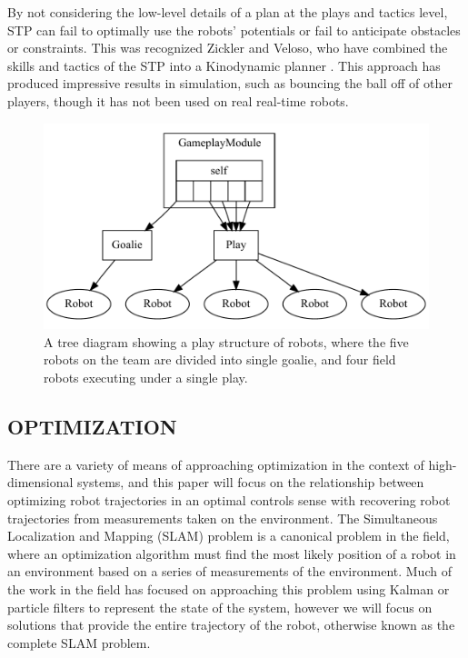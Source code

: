 \documentclass[a4paper, 10pt, conference]{ieeeconf}      %
\begin{document}
By not considering the low-level details of a plan at the plays and tactics level, STP can fail to optimally use the robots' potentials or fail to anticipate obstacles or constraints. This was recognized Zickler and Veloso, who have combined the skills and tactics of the STP into a Kinodynamic planner \cite{zickler2008playing}. This approach has produced impressive results in simulation, such as bouncing the ball off of other players, though it has not been used on real real-time robots.

\begin{figure}[ht!]
\begin{center}
\includegraphics[totalheight=1.6in]{gen_play}
\end{center}
\caption{A tree diagram showing a play structure of robots, where the five robots on the team are divided into single goalie, and four field robots executing under a single play.}
\label{play_structure}
\end{figure}

\subsection{OPTIMIZATION}

There are a variety of means of approaching optimization in the context of high-dimensional systems, and this paper will focus on the relationship between optimizing robot trajectories in an optimal controls sense with recovering robot trajectories from measurements taken on the environment.  The Simultaneous Localization and Mapping (SLAM) problem is a canonical problem in the field, where an optimization algorithm must find the most likely position of a robot in an environment based on a series of measurements of the environment.  Much of the work in the field has focused on approaching this problem using Kalman or particle filters  \cite{Thrun05book, Thrun04ijrr, Dellaert03tutorial} to represent the state of the system, however we will focus on solutions that provide the entire trajectory of the robot, otherwise known as the complete SLAM problem.  
\end{document}

